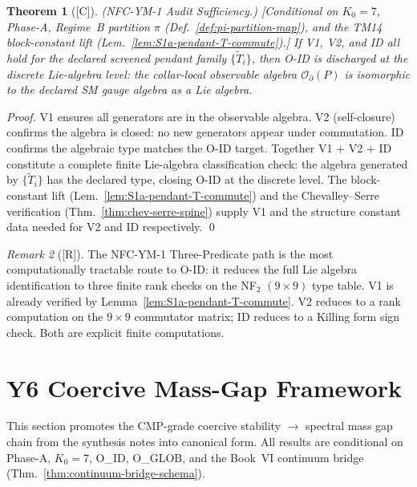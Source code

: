 \documentclass[12pt,oneside]{amsbook}
\theoremstyle{plain}
\newtheorem{theorem}{Theorem}[section]
\theoremstyle{definition}
\theoremstyle{remark}
\newtheorem{remark}[theorem]{Remark}
\newcommand{\status}[1]{\textup{[#1]}}
\begin{document}
\begin{theorem}[\status{C}]\label{thm:ym1-audit-sufficiency}
\textup{(NFC-YM-1 Audit Sufficiency.)}
\textup{[Conditional on $K_0=7$, Phase-A, Regime~B partition
$\pi$ (Def.~\ref{def:pi-partition-map}), and the TM14
block-constant lift (Lem.~\ref{lem:S1a-pendant-T-commute}).]}
If V1, V2, and ID all hold for the declared screened pendant
family $\{\widetilde{T}_i\}$, then O-ID is discharged at the
discrete Lie-algebra level: the collar-local observable algebra
$\mathcal{O}_\partial(P)$ is isomorphic to the declared SM gauge
algebra as a Lie algebra.
\end{theorem}

\begin{proof}
V1 ensures all generators are in the observable algebra.
V2 (self-closure) confirms the algebra is closed: no new
generators appear under commutation. ID confirms the algebraic
type matches the O-ID target. Together V1 + V2 + ID
constitute a complete finite Lie-algebra classification check:
the algebra generated by $\{\widetilde{T}_i\}$ has the declared
type, closing O-ID at the discrete level. The block-constant
lift (Lem.~\ref{lem:S1a-pendant-T-commute}) and the Chevalley--Serre
verification (Thm.~\ref{thm:chev-serre-spine}) supply V1 and the
structure constant data needed for V2 and ID respectively. \qed
\end{proof}

\begin{remark}[\status{R}]
The NFC-YM-1 Three-Predicate path is the most computationally
tractable route to O-ID: it reduces the full Lie algebra
identification to three finite rank checks on the NF$_2$
$(9 \times 9)$ type table. V1 is already verified by
Lemma~\ref{lem:S1a-pendant-T-commute}. V2 reduces to a rank
computation on the $9 \times 9$ commutator matrix; ID reduces
to a Killing form sign check. Both are explicit finite
computations.
\end{remark}

\section{Y6 Coercive Mass-Gap Framework}
\label{sec:ym-y6-coercive}

This section promotes the CMP-grade coercive stability $\to$
spectral mass gap chain from the synthesis notes into canonical form.
All results are conditional on Phase-A, $K_0=7$, O\_ID, O\_GLOB,
and the Book~VI continuum bridge
(Thm.~\ref{thm:continuum-bridge-schema}).
\end{document}
